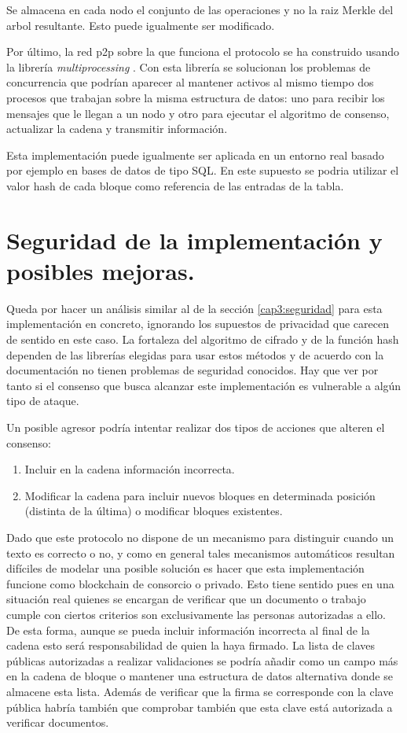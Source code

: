 Se almacena en cada nodo el conjunto de las operaciones y no la raiz Merkle del arbol resultante. Esto puede igualmente ser modificado.

Por último, la red p2p sobre la que funciona el protocolo se ha construido usando la librería \textit{multiprocessing} \citep{multiprocessing}. Con esta librería se solucionan los problemas de concurrencia que podrían aparecer al mantener activos al mismo tiempo dos procesos que trabajan sobre la misma estructura de datos: uno para recibir los mensajes que le llegan a un nodo y otro para ejecutar el algoritmo de consenso, actualizar la cadena y transmitir información.


Esta implementación puede igualmente ser aplicada en un entorno real basado por ejemplo en bases de datos de tipo SQL. En este supuesto se podria utilizar el valor hash de cada bloque como referencia de las entradas de la tabla.


\section{Seguridad de la implementación y posibles mejoras.}
Queda por hacer un análisis similar al de la sección \ref{cap3:seguridad} para esta implementación en concreto, ignorando los supuestos de privacidad que carecen de sentido en este caso. La fortaleza del algoritmo de cifrado y de la función hash dependen de las librerías elegidas para usar estos métodos y de acuerdo con la documentación no tienen problemas de seguridad conocidos.
Hay que ver por tanto si el consenso que busca alcanzar este implementación es vulnerable a algún tipo de ataque. 


Un posible agresor podría intentar realizar dos tipos de acciones que alteren el consenso:

\begin{enumerate}
\item Incluir en la cadena información incorrecta.  
\item Modificar la cadena para incluir nuevos bloques en determinada posición (distinta de la última) o modificar bloques existentes.
\end{enumerate}

Dado que este protocolo no dispone de un mecanismo para distinguir cuando un texto es correcto o no, y como en general tales mecanismos automáticos resultan difíciles de modelar una posible solución es hacer que esta implementación funcione como blockchain de consorcio o privado. Esto tiene sentido pues en una situación real quienes se encargan de verificar que un documento o trabajo cumple con ciertos criterios son exclusivamente las personas autorizadas a ello. De esta forma, aunque se pueda incluir información incorrecta al final de la cadena esto será responsabilidad de quien la haya firmado. La lista de claves públicas autorizadas a realizar validaciones se podría añadir como un campo más en la cadena de bloque o mantener una estructura de datos alternativa donde se almacene esta lista. Además de verificar que la firma se corresponde con la clave pública habría también que comprobar también que esta clave está autorizada a verificar documentos.

